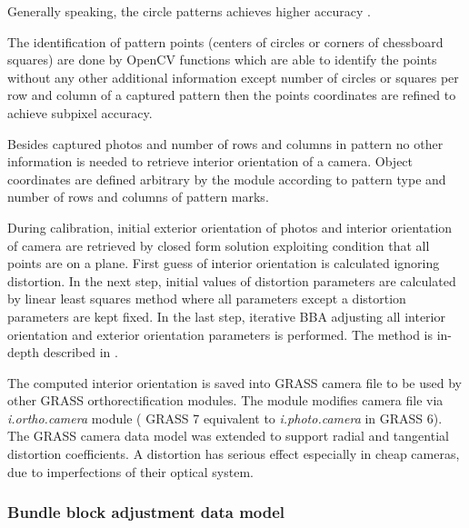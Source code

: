 \documentclass[a4paper,12pt]{article}
\newcommand{\term}[1]{%
{\it #1}%
}
\begin{document}
Generally speaking, the circle patterns achieves higher accuracy \cite{camera_calibration2013opencv}.

The identification of pattern points (centers of circles or corners of chessboard squares) 
are done by OpenCV functions which are able to identify the points
without any other additional information except number of circles or squares per row and column
of a captured pattern then the points coordinates are refined to achieve subpixel accuracy.

Besides  captured photos and number of rows and columns in pattern
no other information is needed to retrieve interior orientation of a camera.
Object coordinates are defined
arbitrary by the module according to pattern type and number of rows and columns of pattern marks.

During calibration, initial exterior orientation of photos and interior orientation of camera are retrieved 
by closed form solution exploiting condition that all points are on a plane.
First guess  of interior orientation is calculated ignoring distortion.
In the next step, initial values of distortion parameters are calculated by linear least squares method
where all parameters except a distortion parameters are kept fixed.
In the last step, iterative BBA adjusting all interior orientation and exterior orientation parameters 
is performed.
The method is in-depth described 
in \cite{zhang2000flexible}.



The computed interior orientation is saved into GRASS camera file to be used by other GRASS 
orthorectification modules. The module modifies camera file via \term{i.ortho.camera} module 
( GRASS 7 equivalent to \term{i.photo.camera} in GRASS 6).
The GRASS camera data model was extended to support radial and tangential distortion coefficients. 
A distortion has serious effect especially in cheap cameras, due to imperfections of their optical system.

\subsubsection{Bundle block adjustment data model}
 
\end{document}
